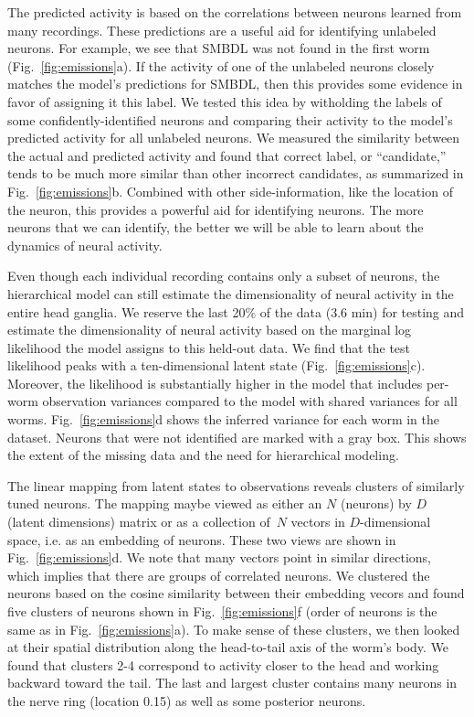 \documentclass[11pt]{article}
\begin{document}
The predicted activity is based on the correlations between neurons
learned from many recordings.  These predictions are a useful aid for
identifying unlabeled neurons.  For example, we see that
\textsf{SMBDL} was not found in the first worm
(Fig.~\ref{fig:emissions}a). If the activity of one of the unlabeled
neurons closely matches the model's predictions for \textsf{SMBDL},
then this provides some evidence in favor of assigning it this
label. We tested this idea by witholding the labels of some
confidently-identified neurons and comparing their activity to the
model's predicted activity for all unlabeled neurons.  We measured the
similarity between the actual and predicted activity and found that
correct label, or ``candidate,'' tends to be much more similar than
other incorrect candidates, as summarized in
Fig.~\ref{fig:emissions}b.  Combined with other side-information, like
the location of the neuron, this provides a powerful aid for identifying
neurons.  The more neurons that we can identify, the better we will be
able to learn about the dynamics of neural activity.

Even though each individual recording contains only a subset of neurons,
the hierarchical model can still estimate the dimensionality of
neural activity in the entire head ganglia.  We reserve the last 20\% of
the data (3.6 min) for testing and estimate the dimensionality
of neural activity based on the marginal log likelihood the model assigns
to this held-out data. We find that the test likelihood peaks with a
ten-dimensional latent state (Fig.~\ref{fig:emissions}c).  Moreover, the likelihood is substantially
higher in the model that includes per-worm observation variances
compared to the model with shared variances for all worms. Fig.~\ref{fig:emissions}d
shows the inferred variance for each worm in the \citet{kato2015global}
dataset.  Neurons that were not identified are marked with a gray box.
This shows the extent of the missing data and the need for hierarchical
modeling.

The linear mapping from latent states to observations reveals clusters
of similarly tuned neurons.  The mapping maybe viewed as either an $N$
(neurons) by $D$ (latent dimensions) matrix or as a collection of~$N$
vectors in $D$-dimensional space, i.e. as an embedding of neurons.
These two views are shown in Fig.~\ref{fig:emissions}d. We note that
many vectors point in similar directions, which implies that there are
groups of correlated neurons.  We clustered the neurons based on the
cosine similarity between their embedding vecors and found five clusters
of neurons shown in Fig.~\ref{fig:emissions}f (order of neurons is the same
as in Fig.~\ref{fig:emissions}a). To make sense of these clusters, we then
looked at their spatial distribution along the head-to-tail axis of the
worm's body.  We found that clusters 2-4 correspond to activity closer to
the head and working backward toward the tail.  The last and largest cluster
contains many neurons in the nerve ring (location 0.15)  as well
as some posterior neurons. 
\end{document}
